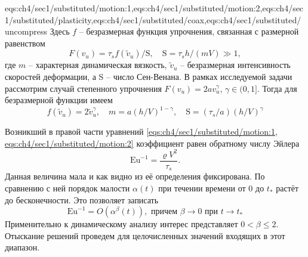 \expandafter\gdef\csname eqs:ch4/sec1/substituted\endcsname{eqs:ch4/sec1/substituted/motion:1,eqs:ch4/sec1/substituted/motion:2,eqs:ch4/sec1/substituted/plasticity,eqs:ch4/sec1/substituted/coax,eqs:ch4/sec1/substituted/uncompress}
Здесь $f$ -- безразмерная функция упрочнения, связанная с размерной равенством
\begin{equation}
  F(v_{u}) = \tau_s f(\tilde{v}_{u}) / \text{S}, \quad \text{S} =  \tau_s h / \left(m V\right) \gg 1,
\end{equation}
где $m$ -- характерная динамическая вязкость, $\tilde{v}_{u}$ -- безразмерная интенсивность скоростей деформации, а S -- число Сен-Венана.
В рамках исследуемой задачи рассмотрим случай степенного упрочнения $F(v_{u}) = 2a v_{u}^\gamma$, $\gamma\in(0,1]$. Тогда для безразмерной функции имеем
\begin{equation}
  f(\tilde{v}_{u}) = 2 \tilde{v}_{u}^\gamma, \quad m= a\left(h/V\right)^{1-\gamma}, \quad \text{S} = \left(\tau_s / a\right) \left(h/V\right)^\gamma
\end{equation}

Возникший в правой части уравнений \cref{eqs:ch4/sec1/substituted/motion:1, eqs:ch4/sec1/substituted/motion:2} коэффициент равен обратному числу Эйлера
\begin{equation*}
  \text{Eu}^{-1} = \frac{\varrho V^2}{\tau_{s}}.
\end{equation*}
Данная величина мала и как видно из её определения фиксирована. По сравнению с ней порядок малости $\alpha(t)$ при течении времени от 0 до $t_*$ растёт до бесконечности. Это позволяет записать
\begin{equation*}
  \text{Eu}^{-1} = O\left(\alpha^\beta(t)\right), \text{ причем } \beta \rightarrow 0 \text{ при } t \rightarrow t_*
\end{equation*}
Применительно к динамическому анализу интерес представляет $0 < \beta \le 2$. Отыскание решений проведем для целочисленных значений входящих в этот диапазон.

